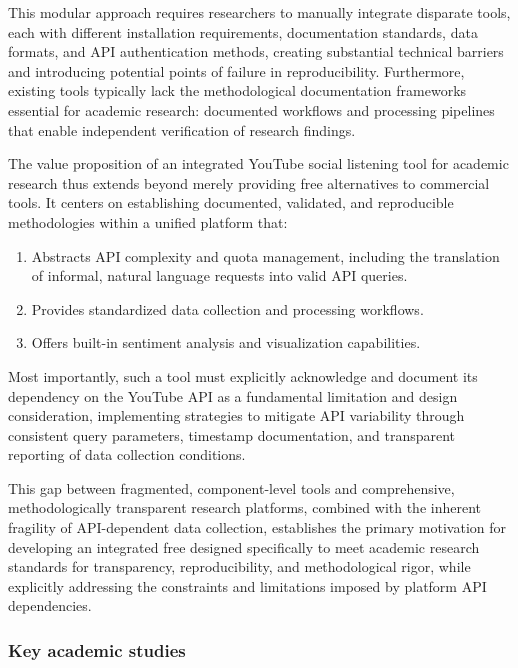This modular approach requires researchers to manually integrate disparate tools, each with different installation requirements, documentation standards, data formats, and API authentication methods, creating substantial technical barriers and introducing potential points of failure in reproducibility. Furthermore, existing tools typically lack the methodological documentation frameworks essential for academic research: documented workflows and processing pipelines that enable independent verification of research findings.

The value proposition of an integrated YouTube social listening tool for academic research thus extends beyond merely providing free alternatives to commercial tools. It centers on establishing documented, validated, and reproducible methodologies within a unified platform that:

\begin{enumerate}
	\item Abstracts API complexity and quota management, including the translation of informal, natural language requests into valid API queries.

	\item Provides standardized data collection and processing workflows.

	\item Offers built-in sentiment analysis and visualization capabilities.
\end{enumerate}

Most importantly, such a tool must explicitly acknowledge and document its dependency on the YouTube API as a fundamental limitation and design consideration, implementing strategies to mitigate API variability through consistent query parameters, timestamp documentation, and transparent reporting of data collection conditions.

This gap between fragmented, component-level tools and comprehensive, methodologically transparent research platforms, combined with the inherent fragility of API-dependent data collection, establishes the primary motivation for developing an integrated free  designed specifically to meet academic research standards for transparency, reproducibility, and methodological rigor, while explicitly addressing the constraints and limitations imposed by platform API dependencies.

\subsubsection{Key academic studies}

